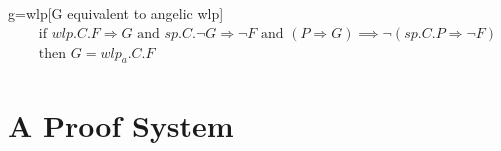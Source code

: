 \begin{corollary}{g=wlp}[G equivalent to angelic wlp]
	\ \\\vspace{-5mm}
	\begin{align*}
		&\text{ if } wlp.C.F\Longrightarrow G \text{ and } 
		sp.C.\neg G \Longrightarrow \neg F \text{ and } 
	(P\Longrightarrow G) \implies \neg(sp.C.P \Longrightarrow \neg F) \\
		&\text{ then } G = wlp_a.C.F
	\end{align*}	
\end{corollary}













\newpage
\section{A Proof System}





